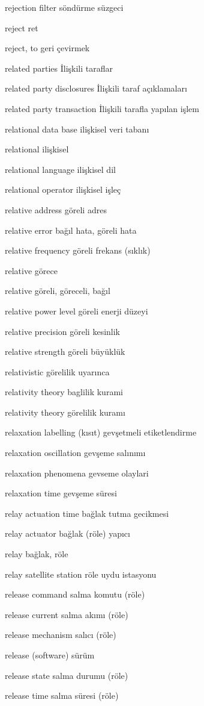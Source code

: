 \documentclass[12pt,fleqn]{article}\usepackage{../../common}
\begin{document}
rejection filter söndürme süzgeci

reject ret

reject, to geri çevirmek

related parties İlişkili taraflar

related party disclosures İlişkili taraf açıklamaları

related party transaction İlişkili tarafla yapılan işlem

relational data base ilişkisel veri tabanı

relational ilişkisel

relational language ilişkisel dil

relational operator ilişkisel işleç

relative address göreli adres

relative error bağıl hata, göreli hata

relative frequency göreli frekans (sıklık)

relative görece

relative göreli, göreceli, bağıl

relative power level göreli enerji düzeyi

relative precision göreli kesinlik

relative strength göreli büyüklük

relativistic görelilik uyarınca

relativity theory baglilik kurami

relativity theory görelilik kuramı

relaxation labelling (kısıt) gevşetmeli etiketlendirme

relaxation oscillation gevşeme salınımı

relaxation phenomena gevseme olaylari

relaxation time gevşeme süresi

relay actuation time bağlak tutma gecikmesi

relay actuator bağlak (röle) yapıcı

relay bağlak, röle

relay satellite station röle uydu istasyonu

release command salma komutu (röle)

release current salma akımı (röle)

release mechanism salıcı (röle)

release (software) sürüm

release state salma durumu (röle)

release time salma süresi (röle)
\end{document}
